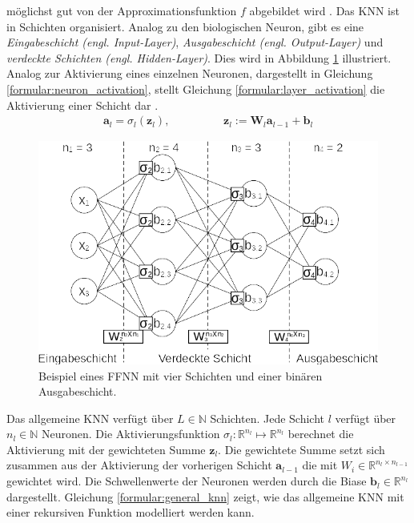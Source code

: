 möglichst gut von der Approximationsfunktion $f$ abgebildet wird \cite{bengio2017deep}.
\newline
\newline
Das KNN ist in Schichten organisiert. Analog zu den biologischen Neuron, gibt es eine \textit{Eingabeschicht (engl. Input-Layer)},
\textit{Ausgabeschicht (engl. Output-Layer)} und \textit{verdeckte Schichten (engl. Hidden-Layer)}.
Dies wird in Abbildung \ref{fig:neural_network_example} illustriert.
Analog zur Aktivierung eines einzelnen Neuronen, dargestellt in Gleichung \ref{formular:neuron_activation}, stellt
Gleichung \ref{formular:layer_activation} die Aktivierung einer Schicht dar \cite{higham2019deep}.
\begin{align}
    \label{formular:layer_activation}
    \textbf{a}_{l} = \sigma_l(\textbf{z}_l), \hspace{2cm} \textbf{z}_l := \textbf{W}_l\textbf{a}_{l-1} + \textbf{b}_l
\end{align}
\begin{figure}[h!]
    \centering
    \includegraphics[width=0.8\linewidth]{images/neural_network_example.png}
    \caption{Beispiel eines FFNN mit vier Schichten und einer binären Ausgabeschicht.}
    \label{fig:neural_network_example}
\end{figure}
\newline
Das allgemeine KNN verfügt über $L\in\mathbb{N}$ Schichten. Jede Schicht $l$ verfügt über $n_l\in\mathbb{N}$ Neuronen.
Die Aktivierungsfunktion $\sigma_l:\mathbb{R}^{n_{l}}\mapsto\mathbb{R}^{n_{l}}$ berechnet die Aktivierung mit der gewichteten Summe $\textbf{z}_l$.
Die gewichtete Summe setzt sich zusammen aus der Aktivierung der vorherigen Schicht $\textbf{a}_{l-1}$ die mit $W_i\in\mathbb{R}^{n_{l}\times{n_{l-1}}}$ gewichtet wird.
Die Schwellenwerte der Neuronen werden durch die Biase $\textbf{b}_l\in\mathbb{R}^{n_{l}}$ dargestellt.
Gleichung \ref{formular:general_knn} zeigt, wie das allgemeine KNN mit einer rekursiven Funktion modelliert werden kann.
